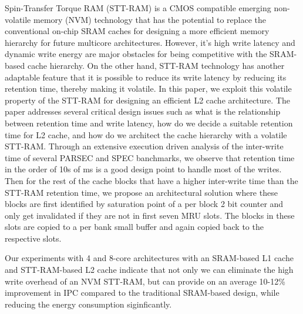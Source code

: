 
Spin-Transfer Torque RAM (STT-RAM) is a CMOS compatible emerging non-volatile memory (NVM) 
technology that has the potential to replace the conventional
on-chip SRAM caches for designing a more efficient memory hierarchy for
future multicore architectures. 
However, it's high write latency and dynamic
write energy are major obstacles for being competitive with the SRAM-based cache hierarchy.
On the other hand, STT-RAM technology has another adaptable feature that it is possible to reduce its write
latency by reducing its retention time, thereby making it volatile.
In this paper, we exploit this volatile property of the STT-RAM for designing an efficient L2 cache 
architecture. The paper addresses several critical design issues such as  what is the relationship
between retention time and write latency, how do we decide a suitable retention time for L2 cache,
and how do we architect the cache hierarchy with a volatile STT-RAM.
Through an extensive execution driven analysis of the inter-write time of several PARSEC and SPEC banchmarks, we 
observe that retention time in the order of 10s of ms is a good design point to handle most of the
writes.  Then for the rest of the cache blocks that have a higher inter-write
time than the STT-RAM
retention time, we propose an architectural solution where these blocks are
first identified by saturation point of a per block 2 bit counter  and only get invalidated if they
are not in first seven MRU slots. The blocks in these slots are copied to
a per bank small buffer and again copied back to the respective slots.

  
Our experiments with 4 and 8-core architectures with an SRAM-based L1 cache and STT-RAM-based L2 cache 
indicate that not only we can eliminate the high write overhead of an NVM STT-RAM, but can provide
on an average 10-12\% improvement in IPC compared to the traditional SRAM-based
design, while reducing
the energy consumption siginficantly. 

